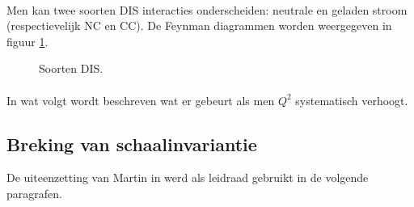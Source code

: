 \documentclass[a4paper,11pt]{article}
\numberwithin{equation}{section} %
\begin{document}
      \paragraph{}
Men kan twee soorten DIS interacties onderscheiden: neutrale en geladen stroom (respectievelijk NC en CC). De Feynman diagrammen worden weergegeven in figuur \ref{fig:NC-CC}.
\begin{figure} [H]
  \centering
  \caption{Soorten DIS. \cite{Martin}}
  \label{fig:NC-CC}
\end{figure}

      \paragraph{}
In wat volgt wordt beschreven wat er gebeurt als men $Q^2$ systematisch verhoogt.

  \subsection{Breking van schaalinvariantie}
De uiteenzetting van Martin in \cite{Martin} werd als leidraad gebruikt in de volgende paragrafen.
\end{document}
